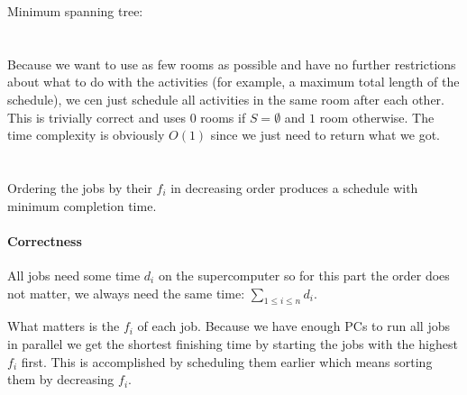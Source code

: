 \documentclass[12pt, a4paper]{article}
\begin{document}
Minimum spanning tree:

\section{} %

Because we want to use as few rooms as possible and have no further restrictions about what to do with the activities (for example, a maximum total length of the schedule), we cen just schedule all activities in the same room after each other. This is trivially correct and uses $0$ rooms if $S = \emptyset$ and $1$ room otherwise. The time complexity is obviously $O(1)$ since we just need to return what we got.

\section{} %

Ordering the jobs by their $f_i$ in decreasing order produces a schedule with minimum completion time.

\paragraph{Correctness}
All jobs need some time $d_i$ on the supercomputer so for this part the order does not matter, we always need the same time: $\sum_{1 \leq i \leq n} d_i$.

What matters is the $f_i$ of each job. Because we have enough PCs to run all jobs in parallel we get the shortest finishing time by starting the jobs with the highest $f_i$ first. This is accomplished by scheduling them earlier which means sorting them by decreasing $f_i$.
\end{document}
